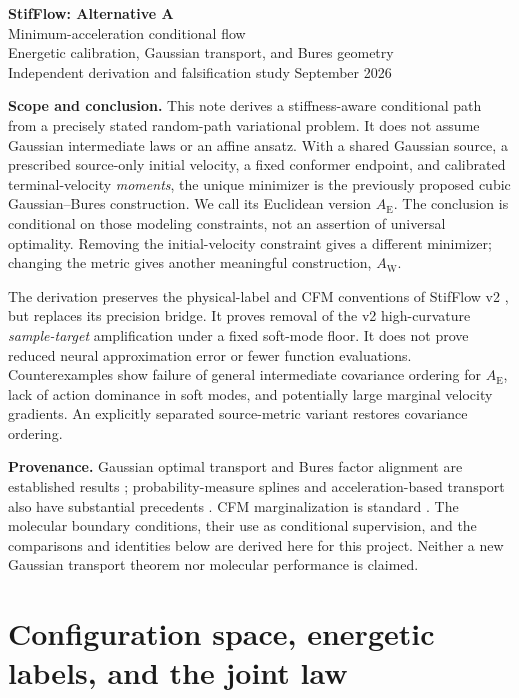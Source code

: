 \documentclass[11pt,letterpaper]{article}
\newcommand{\AltE}{A_{\mathrm E}}
\newcommand{\AltW}{A_{\mathrm W}}
\begin{document}
\thispagestyle{plain}
\begin{center}
{\LARGE\bfseries StifFlow: Alternative A}\\[4pt]
{\Large Minimum-acceleration conditional flow}\\[5pt]
{\small Energetic calibration, Gaussian transport, and Bures geometry}\\[3pt]
{\small Independent derivation and falsification study  September 2026}
\end{center}

\textbf{Scope and conclusion.} This note derives a stiffness-aware conditional path from a precisely stated random-path variational problem. It does not assume Gaussian intermediate laws or an affine ansatz. With a shared Gaussian source, a prescribed source-only initial velocity, a fixed conformer endpoint, and calibrated terminal-velocity \emph{moments}, the unique minimizer is the previously proposed cubic Gaussian--Bures construction. We call its Euclidean version $\AltE$. The conclusion is conditional on those modeling constraints, not an assertion of universal optimality. Removing the initial-velocity constraint gives a different minimizer; changing the metric gives another meaningful construction, $\AltW$.

The derivation preserves the physical-label and CFM conventions of StifFlow v2 \cite{baseline}, but replaces its precision bridge. It proves removal of the v2 high-curvature \emph{sample-target} amplification under a fixed soft-mode floor. It does not prove reduced neural approximation error or fewer function evaluations. Counterexamples show failure of general intermediate covariance ordering for $\AltE$, lack of action dominance in soft modes, and potentially large marginal velocity gradients. An explicitly separated source-metric variant restores covariance ordering.

\textbf{Provenance.} Gaussian optimal transport and Bures factor alignment are established results \cite{bhatia}; probability-measure splines and acceleration-based transport also have substantial precedents \cite{benamou,chen}. CFM marginalization is standard \cite{lipman}. The molecular boundary conditions, their use as conditional supervision, and the comparisons and identities below are derived here for this project. Neither a new Gaussian transport theorem nor molecular performance is claimed.

\section{Configuration space, energetic labels, and the joint law}
\label{sec:physical}
\end{document}
